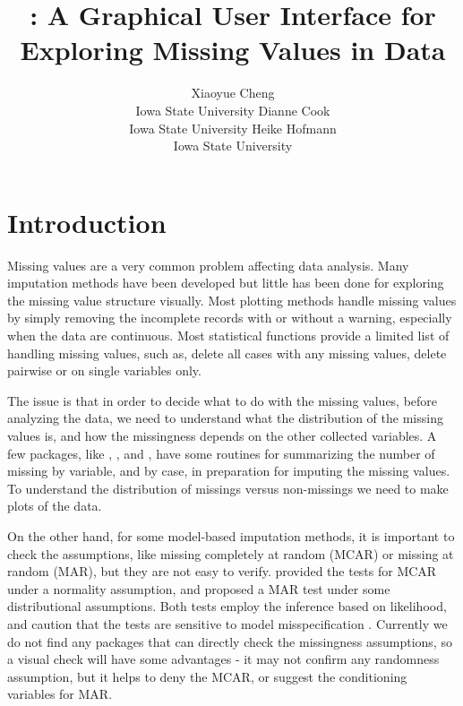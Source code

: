\documentclass[article]{jss}
\author{Xiaoyue Cheng\\Iowa State University \And 
        Dianne Cook\\Iowa State University \And
        Heike Hofmann\\Iowa State University}
\title{\pkg{MissingDataGUI}: A Graphical User Interface for Exploring 
	Missing Values in Data}
\begin{document}
\section{Introduction}\label{introduction}

Missing values are a very common problem affecting data analysis. Many imputation methods have been developed but little has been done for exploring the missing value structure visually.  Most plotting methods handle missing values by simply removing the incomplete records with or without a warning, especially when the data are continuous. Most statistical functions provide a limited list of handling missing values, such as, delete all cases with any missing values, delete pairwise or on single variables only.

The issue is that in order to decide what to do with the missing values, before analyzing the data, we need to understand what the distribution of the missing values is, and how the missingness depends on the other collected variables. A few  packages, like  \citep{hmisc},  \citep{norm}, and  \citep{mice}, have some routines for summarizing the number of missing by variable, and by case, in preparation for imputing the missing values. To understand the distribution of missings versus non-missings we need to make plots of the data.

On the other hand, for some model-based imputation methods, it is important to check the assumptions, like missing completely at random (MCAR) or missing at random (MAR), but they are not easy to verify. \citet{little1988test} provided the tests for MCAR under a normality assumption, and \citet{jaeger2006testing} proposed a MAR test under some distributional assumptions. Both tests employ the inference based on likelihood, and caution that the tests are sensitive to model misspecification \citep{little1988test}. Currently we do not find any  packages that can directly check the missingness assumptions, so a visual check will have some advantages - it may not confirm any randomness assumption, but it helps to deny the MCAR, or suggest the conditioning variables for MAR.
\end{document}
